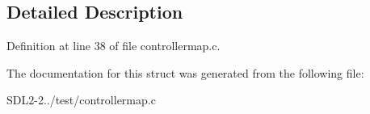 \subsection{Detailed Description}


Definition at line 38 of file controllermap.\+c.



The documentation for this struct was generated from the following file\+:\begin{DoxyCompactItemize}
\item 
S\+D\+L2-\/2../test/controllermap.\+c\end{DoxyCompactItemize}
